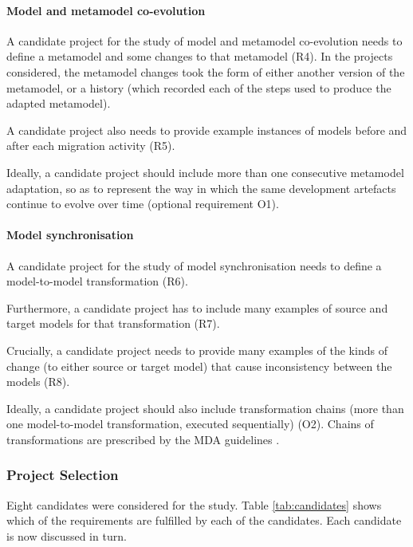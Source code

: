 \paragraph{Model and metamodel co-evolution}
A candidate project for the study of model and metamodel co-evolution needs to define a metamodel and some changes to that metamodel (R4). In the projects considered, the metamodel changes took the form of either another version of the metamodel, or a history (which recorded each of the steps used to produce the adapted metamodel).

A candidate project also needs to provide example instances of models before and after each migration activity (R5).

Ideally, a candidate project should include more than one consecutive metamodel adaptation, so as to represent the way in which the same development artefacts continue to evolve over time (optional requirement O1).

\paragraph{Model synchronisation}
A candidate project for the study of model synchronisation needs to define a model-to-model transformation (R6).

Furthermore, a candidate project has to include many examples of source and target models for that transformation (R7).

Crucially, a candidate project needs to provide many examples of the kinds of change (to either source or target model) that cause inconsistency between the models (R8). 

Ideally, a candidate project should also include transformation chains (more than one model-to-model transformation, executed sequentially) (O2). Chains of transformations are prescribed by the MDA guidelines \cite{kleppe03mda}.


\subsubsection{Project Selection} %
\label{ssub:project_selection}
Eight candidates were considered for the study. Table \ref{tab:candidates} shows which of the requirements are fulfilled by each of the candidates. Each candidate is now discussed in turn.

